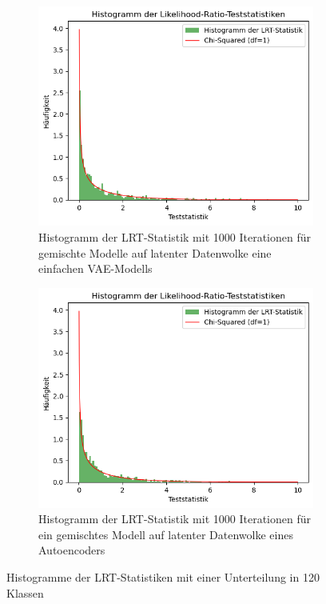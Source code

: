 \documentclass[%
thesis=student,%
coverpage=false,%
titlepage=false,%
headmarks=true, %
german,%
font=libertine, %
math=newpxtx, %
BCOR=5mm,%
coverBCOR=11mm%
]{tumbook}
\theoremstyle{break}
\begin{document}
\\
\begin{figure}[h]
	\centering
	\begin{subfigure}[b]{0.45\textwidth}
		\centering
		\includegraphics[width=\textwidth]{plots/1_latent_dim_VAE.png}
		\caption{Histogramm der LRT-Statistik mit 1000 Iterationen für gemischte Modelle auf latenter Datenwolke eine einfachen VAE-Modells}
		\label{fig:HIST_1latent_dim}
	\end{subfigure}
	\hfill
	\begin{subfigure}[b]{0.45\textwidth}
		\centering
		\includegraphics[width=\textwidth]{plots/Autoencoder.png}
		\caption{Histogramm der LRT-Statistik mit 1000 Iterationen für ein gemischtes Modell auf latenter Datenwolke eines Autoencoders}
		\label{fig:HIST_Autoencoder}
	\end{subfigure}
	\caption{Histogramme der LRT-Statistiken mit einer Unterteilung in 120 Klassen}
	\label{fig:LRT_HIST2}
\end{figure}
\end{document}
